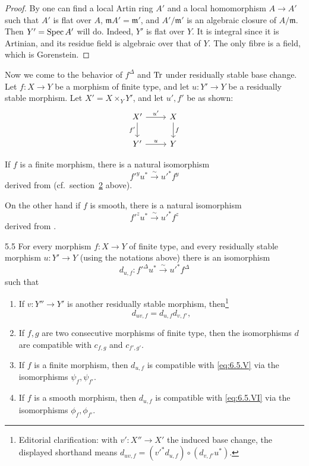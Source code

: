 \begin{proof}
By \cite[\nopp $0_{\mathrm{III}}$,~10.3.1]{EGA} one can find a local Artin ring $A'$ and a local homomorphism $A\to A'$ such that $A'$ is flat over $A$, $\mathfrak{m}A' = \mathfrak{m}'$, and $A'/\mathfrak{m}'$ is an algebraic closure of $A/\mathfrak{m}$. Then $Y' = \operatorname{Spec} A'$ will do. Indeed, $Y'$ is flat over $Y$. It is integral since it is Artinian, and its residue field is algebraic over that of $Y$. The only fibre is a field, which is Gorenstein.
\end{proof}

\par\endgroup

\begingroup
\setlength{\emergencystretch}{2em}
Now we come to the behavior of $f^{\Delta}$ and $\operatorname{Tr}$ under residually stable base change. Let $f\colon X\to Y$ be a morphism of finite type, and let $u\colon Y'\to Y$ be a residually stable morphism. Let $X' = X\times_{Y} Y'$, and let $u', f'$ be as shown:
\[
\begin{tikzcd}
X' \ar[r,"u'"] \ar[d,"f'"'] & X \ar[d,"f"] \\
Y' \ar[r,"u"] & Y
\end{tikzcd}
\]

If $f$ is a finite morphism, there is a natural isomorphism
\[
f'^{y}u^{*} \xrightarrow{\sim} u'^{*}f^{y} \tag{V}\label{eq:6.5.V}
\]
derived from  (cf.\ section~\hyperref[sec:6.2]{2} above).

On the other hand if $f$ is smooth, there is a natural isomorphism
\[
f'^{z}u^{*} \xrightarrow{\sim} u'^{*}f^{z} \tag{VI}\label{eq:6.5.VI}
\]
derived from .

\begin{booktheorem}{5.5}\label{thm:6.5.5}
For every morphism $f\colon X\to Y$ of finite type, and every residually stable morphism $u\colon Y'\to Y$ (using the notations above) there is an isomorphism
\[
d_{u,f}\colon f'^{\Delta}u^{*} \xrightarrow{\sim} u'^{*}f^{\Delta}
\]
such that
\begin{enumerate}
\item[1)] If $v\colon Y''\to Y'$ is another residually stable morphism, then\footnote{Editorial clarification: with $v'\colon X''\to X'$ the induced base change, the displayed shorthand means $d_{uv,f}=(v'^*d_{u,f})\circ(d_{v,f'}u^*)$.}
\[
d_{uv,f}=d_{u,f}d_{v,f'},
\]
\item[2)] If $f,g$ are two consecutive morphisms of finite type, then the isomorphisms $d$ are compatible with $c_{f,g}$ and $c_{f',g'}$.
\item[3)] If $f$ is a finite morphism, then $d_{u,f}$ is compatible with \eqref{eq:6.5.V} via the isomorphisms $\psi_f,\psi_{f'}$.
\item[4)] If $f$ is a smooth morphism, then $d_{u,f}$ is compatible with \eqref{eq:6.5.VI} via the isomorphisms $\phi_f,\phi_{f'}$.
\end{enumerate}
\end{booktheorem}

